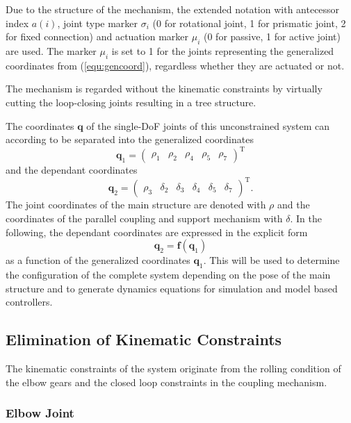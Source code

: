 \documentclass[letterpaper, 10 pt, conference]{ieeeconf}  %
\begin{document}
Due to the structure of the mechanism, the extended notation with antecessor index $a(i)$, joint type marker $\sigma_i$ (0 for rotational joint, 1 for prismatic joint, 2 for fixed connection) and actuation marker $\mu_i$ (0 for passive, 1 for active joint) are used.
The marker $\mu_i$ is set to 1 for the joints representing the generalized coordinates from (\ref{equ:gencoord}), regardless whether they are actuated or not.

The mechanism is regarded without the kinematic constraints by virtually cutting the loop-closing joints resulting in a tree structure.

The coordinates $\bm{q}$ of the single-DoF joints of this unconstrained system can according to \cite{NakamuraGho1989} be separated into the generalized coordinates
%
\begin{equation}
\bm{q}_1=\begin{pmatrix}\rho_1 & \rho_2 & \rho_4 & \rho_5 &\rho_7 \end{pmatrix}^\mathrm{T}
\end{equation}
%
and the dependant coordinates
%
\begin{equation}
\bm{q}_2=\begin{pmatrix}\rho_3 & \delta_2 & \delta_3 & \delta_4 & \delta_5 & \delta_7 \end{pmatrix}^\mathrm{T}.
\label{equ:gencoord}
\end{equation}
%
The joint coordinates of the main structure are denoted with $\rho$ and the coordinates of the parallel coupling and support mechanism with $\delta$.
%
In the following, the dependant coordinates are expressed in the explicit form
%
\begin{equation}
\bm{q}_2=\bm{f}(\bm{q}_1)
\end{equation}
%
as a function of the generalized coordinates $\bm{q}_1$.
This will be used to determine the configuration of the complete system depending on the pose of the main structure and to generate dynamics equations for simulation and model based controllers.

\subsection{Elimination of Kinematic Constraints}

The kinematic constraints of the system originate from the rolling condition of the elbow gears and the closed loop constraints in the coupling mechanism.

\subsubsection{Elbow Joint}
\end{document}
